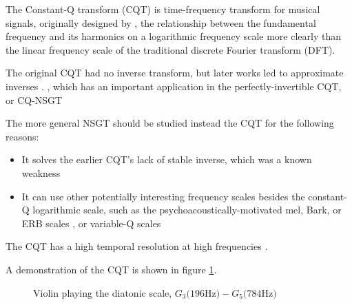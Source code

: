 \documentclass[letter,12pt,notitlepage]{article}
\begin{document}

The Constant-Q transform (CQT) is time-frequency transform for musical signals, originally designed by \textcite{jbrown}, the relationship between the fundamental frequency and its harmonics on a logarithmic frequency scale more clearly than the linear frequency scale of the traditional discrete Fourier transform (DFT).

The original CQT had no inverse transform, but later works led to approximate inverses \cite{klapuricqt, fitzgeraldcqt}. 
, which has an important application in the perfectly-invertible CQT, or CQ-NSGT \cite{invertiblecqt}

The more general NSGT should be studied instead the CQT for the following reasons:
\begin{itemize}
	\item
		It solves the earlier CQT's \cite{jbrown, klapuricqt, fitzgeraldcqt} lack of stable inverse, which was a known weakness \cite{lackinverse}
	\item
		It can use other potentially interesting frequency scales besides the constant-Q logarithmic scale, such as the psychoacoustically-motivated mel, Bark, or ERB scales , or variable-Q scales 
\end{itemize}

 The CQT has a high temporal resolution at high frequencies \cite{cqtransient} .

 A demonstration of the CQT is shown in figure \ref{fig:earlycqt}.

\begin{figure}[ht]
	\centering
	\caption{Violin playing the diatonic scale, $G_{3} \text{(196Hz)} - G_{5} \text{(784Hz)}$}
	\label{fig:earlycqt}
\end{figure}
\end{document}
